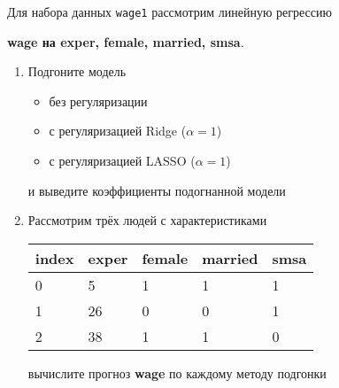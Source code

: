 \begin{exercise}
Для набора данных \texttt{wage1} рассмотрим линейную регрессию 
\begin{center}
	\textbf{wage на exper, female, married, smsa}.
\end{center}
\begin{enumerate}
	\item Подгоните модель
	\begin{itemize}
		\item без регуляризации
		\item с регуляризацией Ridge (\(\alpha=1\))
		\item с регуляризацией LASSO (\(\alpha=1\))
	\end{itemize}
	и выведите коэффициенты подогнанной модели
	\item Рассмотрим трёх людей с характеристиками
	\begin{center}
		\begin{tabular}{|l||l|l|l|l|}\hline
			index & exper & female & married & smsa \\ \hline\hline
			0 & 5 & 1 & 1 & 1  \\
			1 & 26 & 0 & 0 & 1 \\
			2 & 38 & 1 & 1 & 0 \\ \hline
		\end{tabular}
	\end{center}
	вычислите прогноз \textbf{wage} по каждому методу подгонки
\end{enumerate}
\end{exercise}

